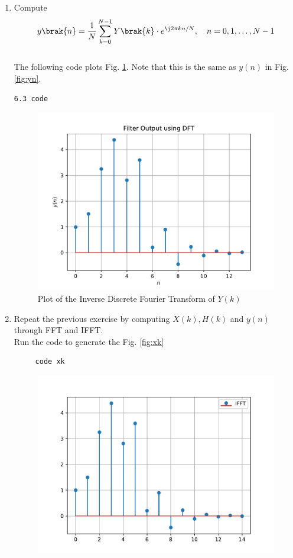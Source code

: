 \documentclass[journal,12pt,twocolumn]{IEEEtran}
\renewcommand\thesection{\arabic{section}}
\begin{document}
\begin{enumerate}[label=\thesection.\arabic*]
\item Compute
\begin{equation}
 y\brak{n}={\frac {1}{N}}\sum _{k=0}^{N-1}Y\brak{k}\cdot e^{\j 2\pi kn/N},\quad n = 0,1,\dots, N-1
\end{equation}
\\
\solution The following code plots Fig. \ref{fig:yndft}. Note that this is the same as 
$y(n)$ in  Fig. 
\ref{fig:yn}. 
%
\begin{lstlisting}
6.3 code 
\end{lstlisting}
\begin{figure}[!ht]
\centering
\includegraphics[width=\columnwidth]{figs/q6/yndft.pdf}
\caption{Plot of the Inverse Discrete Fourier Transform of $Y(k)$}
\label{fig:yndft}
\end{figure}
\item Repeat the previous exercise by computing $X(k), H(k)$ and $y(n)$ through FFT and 
IFFT. \\
\solution
Run the code to generate the Fig. \ref{fig:xk}
\begin{lstlisting}
     code xk
\end{lstlisting}
\begin{figure}[!ht]
\centering
\includegraphics[width=\columnwidth]{figs/q6/xk.pdf}

\end{figure}
\end{enumerate}
\end{document}
